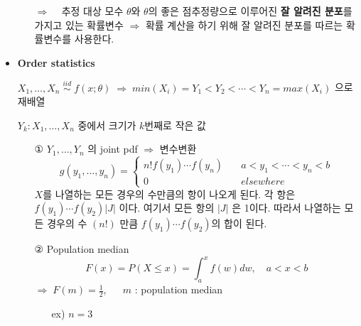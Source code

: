\documentclass{oblivoir}
\begin{document}
\begin{itemize}
\begin{itemize}
$\Rightarrow$ ~ 추정 대상 모수 $\theta$와 $\theta$의 좋은 점추정량으로 이루어진 \textbf{잘 알려진 분포}를 가지고 있는 확률변수
$\Rightarrow$ 확률 계산을 하기 위해 잘 알려진 분포를 따르는 확률변수를 사용한다.
\end{itemize}

\item
\textbf{Order statistics}

$X_1, \ldots, X_n \; \overset{iid}{\sim} \; f(x ; \theta) \; \Rightarrow \; min(X_i) = Y_1 < Y_2 < \cdots < Y_n = max(X_i)$ 으로 재배열

$Y_k : X_1, \ldots, X_n $ 중에서 크기가 $k$번째로 작은 값

\begin{itemize}
\item[①] 
$Y_1, \ldots, Y_n$ 의 joint pdf $\Rightarrow$ 변수변환
$$
g(y_1, \ldots, y_n) = 
\begin{cases}
n! f(y_1)\cdots f(y_n) \quad & a < y_1 < \cdots < y_n < b \\
0 & elsewhere
\end{cases} 
$$
$X$를 나열하는 모든 경우의 수만큼의 항이 나오게 된다. 각 항은 $f(y_1) \cdots f(y_2) |J|$ 이다. 여기서 모든 항의 $|J|$ 은 1이다. 
따라서 나열하는 모든 경우의 수 $(n!)$ 만큼 $f(y_1) \cdots f(y_2)$의 합이 된다.

\item[②] 
Population median
$$
F(x) = P(X \leq x) = \int_a^x f(w) dw, \quad a < x < b
$$
$\Rightarrow \; F(m) = \frac{1}{2}$, ~~ $m$ : population median 

\begin{itemize}
\item[ex)] 
$n = 3$


\end{itemize}
\end{itemize}
\end{itemize}
\end{document}
